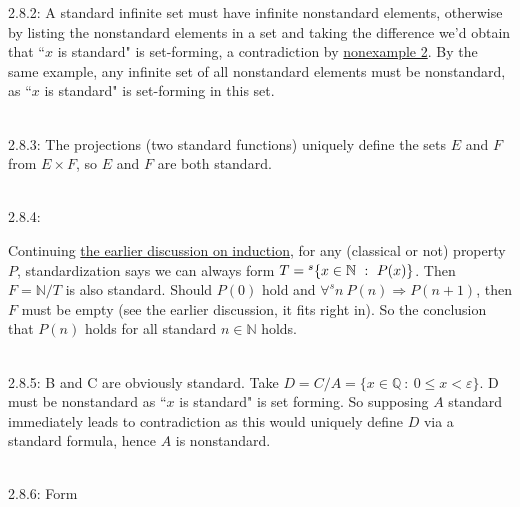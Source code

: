\documentclass{article}
\newcommand{\hsp}[1][5]{\hspace{0.#1 cm}}
\newcommand{\imp}{\Rightarrow}
\newcommand{\st}{\ : \ }
\newcommand{\N}{\mathbb{N}}
\newcommand{\Q}{\mathbb{Q}}
\newcommand{\mycomment}[1]{}
\begin{document}
\begin{flushleft}
\hsp 2.8.2: A standard infinite set must have infinite nonstandard elements, otherwise by listing the nonstandard elements in a set and taking the difference we'd obtain that ``$x$ is standard" is set-forming, a contradiction by \hyperlink{non2}{nonexample 2}. By the same example, any infinite set of all nonstandard elements must be nonstandard, as ``$x$ is standard" is set-forming in this set.\\\ 

\hsp 2.8.3: The projections (two standard functions) uniquely define the sets $E$ and $F$ from $E\times F$, so $E$ and $F$ are both standard.\\\ 

\hsp \hypertarget{2.8.4}{2.8.4:} Continuing \hyperlink{wellorder}{the earlier discussion on induction}, for any (classical or not) property $P$, standardization says we can always form $T = \vphantom{k}^s\{x \in \N \st P(x)\}$. Then $F = \N/T$ is also standard. Should $P(0)$ hold and $\forall^s n\ P(n) \imp P(n+1)$, then $F$ must be empty (see the earlier discussion, it fits right in). So the conclusion that $P(n)$ holds for all standard $ n\in \N$ holds.\\\ 

\hsp 2.8.5: B and C are obviously standard. Take $D = C/A = \{x\in \Q \st 0\leq x < \varepsilon\}$. D must be nonstandard as ``$x$ is standard" is set forming. So supposing $A$ standard immediately leads to contradiction as this would uniquely define $D$ via a standard formula, hence $A$ is nonstandard.\\\ 

\hsp 2.8.6: Form 	























\mycomment{
\hangindent=0cm
Last one is quickest: If the vector field $F$ is conservative, then it comes from some scalar field $s$ like so: $$F =  \nabla s$$
So just take the curl of the vector field. If it is indeed conservative, then the curl will be 0 everywhere, as the curl of any gradient is 0:
$$\nabla \times F = \nabla \times \nabla s = 0$$
As for why the curl of a gradient is 0... this is a very informal explanation, but think of gradient as measuring how the scalar field changes \textit{with space}. I.e. it "adds" a spatial component in to form the vector field $\nabla s$. The curl looks at how it changes against space, rotating from one coordinate to another at a point rather than going anywhere. But the only change in $\nabla s$ is with space. Hence $\nabla \times \nabla s = 0$. If you think about this for a while and it doesn't make sense, just ignore it and remember $\nabla \times \nabla$ is 0 lol\\\ 


}
\end{flushleft}
\end{document}
